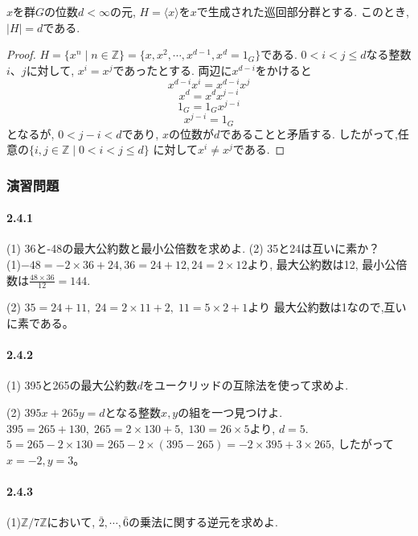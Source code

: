 \begin{tcolorbox}
	\begin{prp*}
		$x$を群$G$の位数$d<\infty$の元,
		$H=\langle x \rangle $を$x$で生成された巡回部分群とする.
		このとき, $ |H|=d $である.
	\end{prp*}
\end{tcolorbox}
\begin{proof}
	$H = \{ x^n \mid n \in \mathbb{Z} \} = \{x, x^2, \cdots, x^{d-1}, x^d=1_G \}$である.
	$ 0 < i < j \leq d $なる整数$i$、$j$に対して, $ x^i = x^j $であったとする.
	両辺に$x^{d-i}$をかけると
	\[x^{d-i}x^i = x^{d-i}x^j\]
	\[x^d = x^d x^{j-i}\]
	\[1_G = 1_G x^{j-i}\]
	\[x^{j-i} = 1_G\]
	となるが, $ 0< j-i <d $であり, $x$の位数が$d$であることと矛盾する.
	したがって,任意の$ \{i,j \in \mathbb{Z} \mid 0 < i < j \leq d \}$
	に対して$ x^i \neq x^j$である.
\end{proof}\leavevmode

\subsubsection*{演習問題}

\paragraph{2.4.1} (1) 36と-48の最大公約数と最小公倍数を求めよ.
(2) 35と24は互いに素か？\\

(1)$-48=-2\times 36+24,36=24+12,24=2\times 12$より,
最大公約数は12, 最小公倍数は$\frac{48\times 36}{12}=144$.

(2) $35=24+11,\; 24=2\times 11+2,\; 11=5\times 2+1$より
最大公約数は1なので,互いに素である。\\

\paragraph{2.4.2} (1) 395と265の最大公約数$d$をユークリッドの互除法を使って求めよ.

(2) $395x+265y=d$となる整数$x,y$の組を一つ見つけよ.\\

$395 = 265+130,\; 265=2\times 130+5,\; 130=26\times 5$より, $d=5$.
$ 5=265-2\times 130=265 - 2\times(395-265)=-2\times 395 +3\times 265$,
したがって$x=-2,y=3$。\\

\paragraph{2.4.3} (1)$\mathbb{Z}/7\mathbb{Z}$において,
$\bar{2},\cdots,\bar{6}$の乗法に関する逆元を求めよ.

